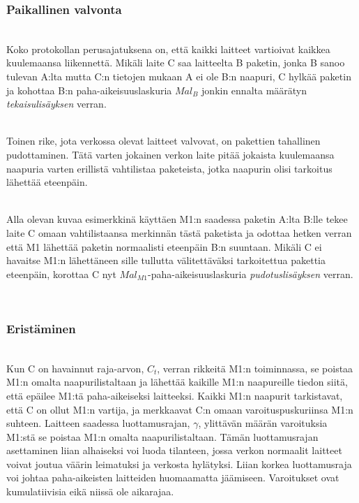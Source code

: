 \documentclass[finnish]{tktltiki2}
\theoremstyle{definition}
\theoremstyle{remark}
\begin{document}
\subsubsection{Paikallinen valvonta}
\noindent \\
Koko protokollan perusajatuksena on, että kaikki laitteet vartioivat kaikkea kuulemaansa liikennettä. Mikäli laite C saa laitteelta B paketin, jonka B sanoo tulevan A:lta mutta C:n tietojen mukaan A ei ole B:n naapuri, C hylkää paketin ja kohottaa B:n paha-aikeisuuslaskuria $Mal_B$ jonkin ennalta määrätyn \emph{tekaisulisäyksen} verran.

\noindent \\
Toinen rike, jota verkossa olevat laitteet valvovat, on pakettien tahallinen pudottaminen. Tätä varten jokainen verkon laite pitää jokaista kuulemaansa naapuria varten erillistä vahtilistaa paketeista, jotka naapurin olisi tarkoitus lähettää eteenpäin. 

\noindent \\
Alla olevan kuvaa esimerkkinä käyttäen M1:n saadessa paketin A:lta B:lle tekee laite C omaan vahtilistaansa merkinnän tästä paketista ja odottaa hetken verran että M1 lähettää paketin normaalisti eteenpäin B:n suuntaan. Mikäli C ei havaitse M1:n lähettäneen sille tullutta välitettäväksi tarkoitettua pakettia eteenpäin, korottaa C nyt $Mal_{M1}$-paha-aikeisuuslaskuria \emph{pudotuslisäyksen} verran.

\noindent\\

\subsubsection{Eristäminen}
\noindent \\
Kun C on havainnut raja-arvon, $C_t$, verran rikkeitä M1:n toiminnassa, se poistaa M1:n omalta naapurilistaltaan ja lähettää kaikille M1:n naapureille tiedon siitä, että epäilee M1:tä paha-aikeiseksi laitteeksi. Kaikki M1:n naapurit tarkistavat, että C on ollut M1:n vartija, ja merkkaavat C:n omaan varoituspuskuriinsa M1:n suhteen. Laitteen saadessa luottamusrajan, $\gamma$, ylittävän määrän varoituksia M1:stä se poistaa M1:n omalta naapurilistaltaan. Tämän luottamusrajan asettaminen liian alhaiseksi voi luoda tilanteen, jossa verkon normaalit laitteet voivat joutua väärin leimatuksi ja verkosta hylätyksi. Liian korkea luottamusraja voi johtaa paha-aikeisten laitteiden huomaamatta jäämiseen. Varoitukset ovat kumulatiivisia eikä niissä ole aikarajaa.
\end{document}
